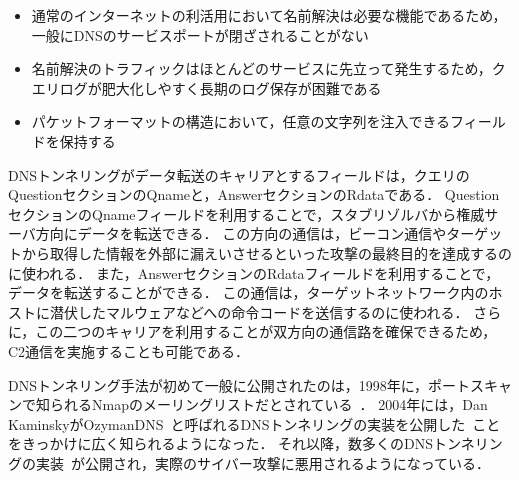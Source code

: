 \begin{itemize}
 \setlength{\itemsep}{0pt}
 \item 通常のインターネットの利活用において名前解決は必要な機能であるため，一般にDNSのサービスポートが閉ざされることがない
 \item 名前解決のトラフィックはほとんどのサービスに先立って発生するため，クエリログが肥大化しやすく長期のログ保存が困難である
 \item パケットフォーマットの構造において，任意の文字列を注入できるフィールドを保持する
\end{itemize}

DNSトンネリングがデータ転送のキャリアとするフィールドは，クエリのQuestionセクションのQnameと，AnswerセクションのRdataである．
QuestionセクションのQnameフィールドを利用することで，スタブリゾルバから権威サーバ方向にデータを転送できる．
この方向の通信は，ビーコン通信やターゲットから取得した情報を外部に漏えいさせるといった攻撃の最終目的を達成するのに使われる．
また，AnswerセクションのRdataフィールドを利用することで，データを転送することができる．
この通信は，ターゲットネットワーク内のホストに潜伏したマルウェアなどへの命令コードを送信するのに使われる．
さらに，この二つのキャリアを利用することが双方向の通信路を確保できるため，C2通信を実施することも可能である．

DNSトンネリング手法が初めて一般に公開されたのは，1998年に，ポートスキャンで知られるNmapのメーリングリストだとされている~\cite{nmap, maarten}．
2004年には，Dan KaminskyがOzymanDNS~\cite{ozymandns}と呼ばれるDNSトンネリングの実装を公開した~\cite{dan-kaminsky}ことをきっかけに広く知られるようになった．
それ以降，数多くのDNSトンネリングの実装~\cite{heyoka, iodine, dnscat2, tcp-over-dns, dnscat, denise, dns-shell, dnsbotnet, dnscapy, dohtunnel, godoh, dohc2, magictunnelandroid, dns2tcp, tuns}が公開され，実際のサイバー攻撃に悪用されるようになっている．

